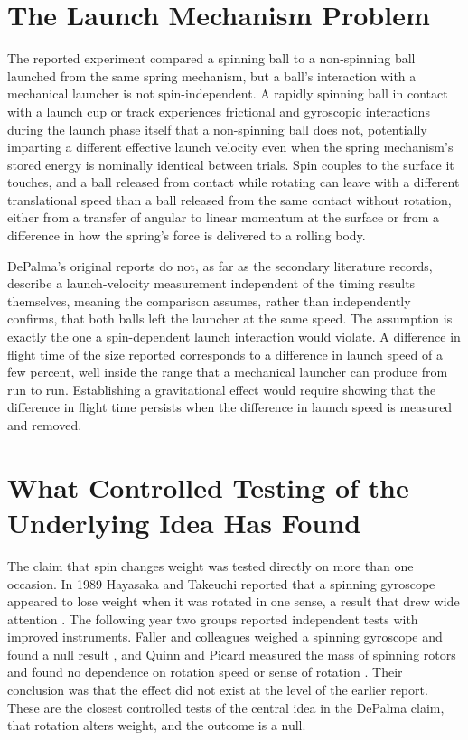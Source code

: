 \documentclass[11pt]{article}
\begin{document}
\section{The Launch Mechanism Problem}

The reported experiment compared a spinning ball to a non-spinning ball launched from the same spring mechanism, but a ball's interaction with a mechanical launcher is not spin-independent. A rapidly spinning ball in contact with a launch cup or track experiences frictional and gyroscopic interactions during the launch phase itself that a non-spinning ball does not, potentially imparting a different effective launch velocity even when the spring mechanism's stored energy is nominally identical between trials. Spin couples to the surface it touches, and a ball released from contact while rotating can leave with a different translational speed than a ball released from the same contact without rotation, either from a transfer of angular to linear momentum at the surface or from a difference in how the spring's force is delivered to a rolling body.

DePalma's original reports do not, as far as the secondary literature records, describe a launch-velocity measurement independent of the timing results themselves, meaning the comparison assumes, rather than independently confirms, that both balls left the launcher at the same speed. The assumption is exactly the one a spin-dependent launch interaction would violate. A difference in flight time of the size reported corresponds to a difference in launch speed of a few percent, well inside the range that a mechanical launcher can produce from run to run. Establishing a gravitational effect would require showing that the difference in flight time persists when the difference in launch speed is measured and removed.

\section{What Controlled Testing of the Underlying Idea Has Found}

The claim that spin changes weight was tested directly on more than one occasion. In 1989 Hayasaka and Takeuchi reported that a spinning gyroscope appeared to lose weight when it was rotated in one sense, a result that drew wide attention \cite{HT1989}. The following year two groups reported independent tests with improved instruments. Faller and colleagues weighed a spinning gyroscope and found a null result \cite{F1990}, and Quinn and Picard measured the mass of spinning rotors and found no dependence on rotation speed or sense of rotation \cite{QP1990}. Their conclusion was that the effect did not exist at the level of the earlier report. These are the closest controlled tests of the central idea in the DePalma claim, that rotation alters weight, and the outcome is a null.
\end{document}
